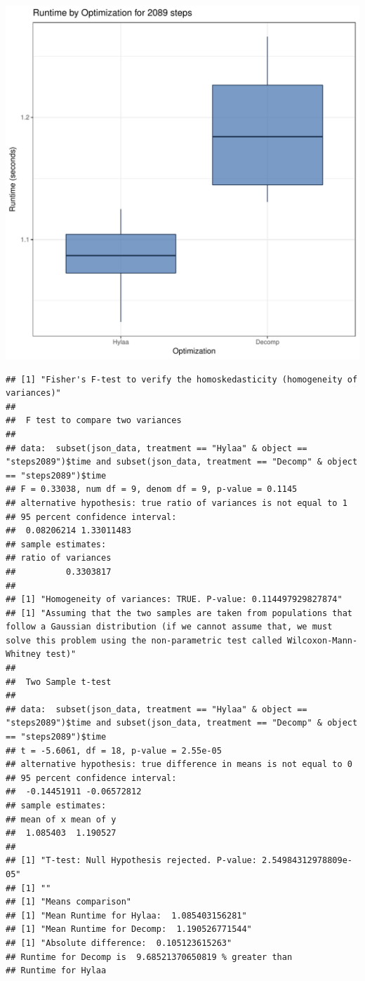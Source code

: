 \documentclass{article}\usepackage[]{graphicx}\usepackage[]{color}
\makeatletter
\def\maxwidth{ %
  \ifdim\Gin@nat@width>\linewidth
    \linewidth
  \else
    \Gin@nat@width
  \fi
}
\newenvironment{kframe}{%
 \def\at@end@of@kframe{}%
 \ifinner\ifhmode%
  \def\at@end@of@kframe{\end{minipage}}%
  \begin{minipage}{\columnwidth}%
 \fi\fi%
 \def\FrameCommand##1{\hskip\@totalleftmargin \hskip-\fboxsep
 \colorbox{shadecolor}{##1}\hskip-\fboxsep
     \hskip-\linewidth \hskip-\@totalleftmargin \hskip\columnwidth}%
 \MakeFramed {\advance\hsize-\width
   \@totalleftmargin\z@ \linewidth\hsize
   \@setminipage}}%
 {\par\unskip\endMakeFramed%
 \at@end@of@kframe}
\newenvironment{knitrout}{}{} %
\makeatother
\begin{document}
\begin{knitrout}
\color{fgcolor}
\includegraphics[width=\maxwidth]{figure/RH2_steps2089-1} 
\begin{kframe}\begin{verbatim}
## [1] "Fisher's F-test to verify the homoskedasticity (homogeneity of variances)"
## 
## 	F test to compare two variances
## 
## data:  subset(json_data, treatment == "Hylaa" & object == "steps2089")$time and subset(json_data, treatment == "Decomp" & object == "steps2089")$time
## F = 0.33038, num df = 9, denom df = 9, p-value = 0.1145
## alternative hypothesis: true ratio of variances is not equal to 1
## 95 percent confidence interval:
##  0.08206214 1.33011483
## sample estimates:
## ratio of variances 
##          0.3303817 
## 
## [1] "Homogeneity of variances: TRUE. P-value: 0.114497929827874"
## [1] "Assuming that the two samples are taken from populations that follow a Gaussian distribution (if we cannot assume that, we must solve this problem using the non-parametric test called Wilcoxon-Mann-Whitney test)"
## 
## 	Two Sample t-test
## 
## data:  subset(json_data, treatment == "Hylaa" & object == "steps2089")$time and subset(json_data, treatment == "Decomp" & object == "steps2089")$time
## t = -5.6061, df = 18, p-value = 2.55e-05
## alternative hypothesis: true difference in means is not equal to 0
## 95 percent confidence interval:
##  -0.14451911 -0.06572812
## sample estimates:
## mean of x mean of y 
##  1.085403  1.190527 
## 
## [1] "T-test: Null Hypothesis rejected. P-value: 2.54984312978809e-05"
## [1] ""
## [1] "Means comparison"
## [1] "Mean Runtime for Hylaa:  1.085403156281"
## [1] "Mean Runtime for Decomp:  1.190526771544"
## [1] "Absolute difference:  0.105123615263"
## Runtime for Decomp is  9.68521370650819 % greater than 
## Runtime for Hylaa
\end{verbatim}
\end{kframe}
\end{knitrout}
\end{document}
